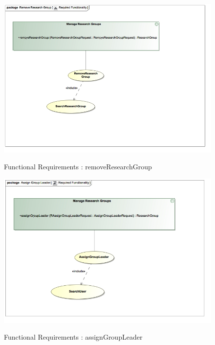 \documentclass{article}
\begin{document}
		\begin{figure}[H]
			\includegraphics[width=\textwidth]{Vuyani_Diagrams/RequiredFunctionalityRemoveResearchGroup.jpg}  \\
			\caption{Functional Requirements : removeResearchGroup}
		\end{figure}
		\begin{figure}[H]
			\includegraphics[width=\textwidth]{Vuyani_Diagrams/RequiredFunctionalityAssignGroupLeader.jpg}  \\
			\caption{Functional Requirements : assignGroupLeader}
		\end{figure}
\end{document}
